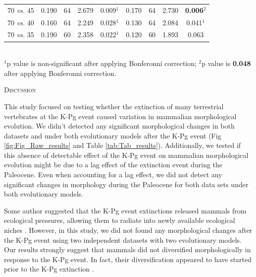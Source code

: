 \documentclass[12pt,letterpaper]{article}
\renewcommand{\section}[1]{%
\bigskip
\begin{center}
\begin{Large}
\normalfont\scshape #1
\medskip
\end{Large}
\end{center}}
\begin{document}
\begin{table}[ht]
\begin{tabular}{c|cccc|cccc}
  70 \textit{vs.} 45 & 0.190 & 64 & 2.679 & 0.009$^1$ & 0.170 & 64 & 2.730 & \textbf{0.006}$^2$ \\ 
  70 \textit{vs.} 40 & 0.160 & 64 & 2.249 & 0.028$^1$ & 0.130 & 64 & 2.084 & 0.041$^1$ \\ 
  70 \textit{vs.} 35 & 0.190 & 60 & 2.358 & 0.022$^1$ & 0.120 & 60 & 1.893 & 0.063 \\ 
   \hline
\end{tabular} \\
   \small{$^1$p value is non-significant after applying Bonferonni correction;
   $^2$p value is \textbf{0.048} after applying Bonferonni correction.}
\end{table}



%
%

\section{Discussion}
This study focused on testing whether the extinction of many terrestrial vertebrates at the K-Pg event caused variation in mammalian morphological evolution.
We didn't detected any significant morphological changes in both datasets and under both evolutionary models after the K-Pg event (Fig \ref{fig:Fig_Raw_results} and Table \ref{tab:Tab_results}).
Additionally, we tested if this absence of detectable effect of the K-Pg event on mammalian morphological evolution might be due to a lag effect of the extinction event during the Paleocene.
Even when accounting for a lag effect, we did not detect any significant changes in morphology during the Paleocene for both data sets under both evolutionary models.

Some author suggested that the K-Pg event extinctions released mammals from ecological pressures, allowing them to radiate into newly available ecological niches \citep{archibald2011extinction,O'Leary08022013,Lovergrove,Slater2012MEE}.
However, in this study, we did not found any morphological changes after the K-Pg event using two independent datasets with two evolutionary models.
Our results strongly %
suggest that mammals did not diversified morphologically in response to the K-Pg event.
In fact, their diversification appeared to have started prior to the K-Pg extinction \citep[Fig \ref{fig:Fig_Raw_results}, Table \ref{tab:Tab_results} and see ][]{meredithimpacts2011,dosReis2014,Close2015,Lee2015R759}.
\end{document}
